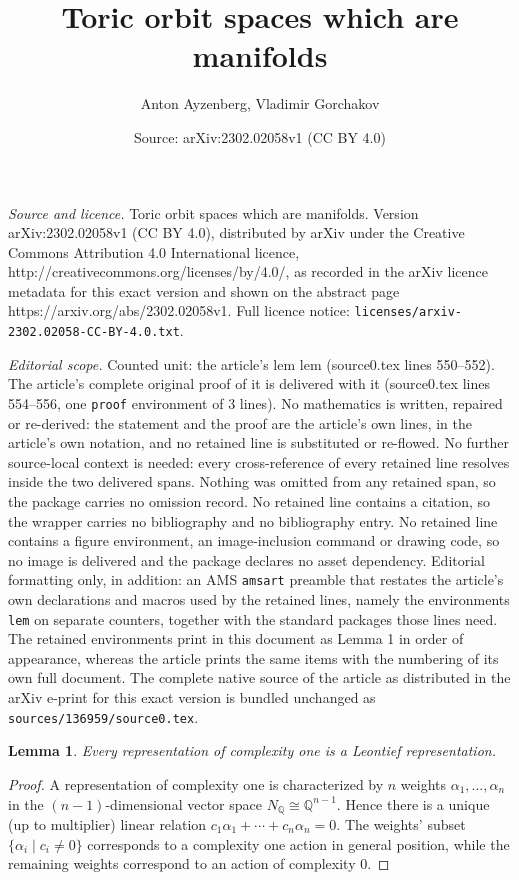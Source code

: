 \documentclass[10pt,a4paper]{amsart}
\title{Toric orbit spaces which are manifolds}
\author{Anton Ayzenberg, Vladimir Gorchakov}
\date{Source: arXiv:2302.02058v1 (CC BY 4.0)}
\newtheorem{lem}{Lemma}
\newcommand{\Nq}{N_\Qo}
\newcommand{\Qo}{\mathbb{Q}}
\begin{document}
\maketitle

\noindent\emph{Source and licence.} Toric orbit spaces which are manifolds. Version arXiv:2302.02058v1 (CC BY 4.0), distributed by arXiv under the Creative Commons Attribution 4.0 International licence, http://creativecommons.org/licenses/by/4.0/, as recorded in the arXiv licence metadata for this exact version and shown on the abstract page https://arxiv.org/abs/2302.02058v1. Full licence notice: \texttt{licenses/arxiv-2302.02058-CC-BY-4.0.txt}.\par\smallskip

\noindent\textit{Editorial scope.} Counted unit: the article's lem lem (source0.tex lines 550--552). The article's complete original proof of it is delivered with it (source0.tex lines 554--556, one \texttt{proof} environment of 3 lines). No mathematics is written, repaired or re-derived: the statement and the proof are the article's own lines, in the article's own notation, and no retained line is substituted or re-flowed.  No further source-local context is needed: every cross-reference of every retained line resolves inside the two delivered spans.  Nothing was omitted from any retained span, so the package carries no omission record.  No retained line contains a citation, so the wrapper carries no bibliography and no bibliography entry.  No retained line contains a figure environment, an image-inclusion command or drawing code, so no image is delivered and the package declares no asset dependency.  Editorial formatting only, in addition: an AMS \texttt{amsart} preamble that restates the article's own declarations and macros used by the retained lines, namely the environments \texttt{lem} on separate counters, together with the standard packages those lines need.  The retained environments print in this document as Lemma 1 in order of appearance, whereas the article prints the same items with the numbering of its own full document.  The complete native source of the article as distributed in the arXiv e-print for this exact version is bundled unchanged as \texttt{sources/136959/source0.tex}.
\begin{lem}
Every representation of complexity one is a Leontief representation.
\end{lem}

\begin{proof}
A representation of complexity one is characterized by $n$ weights $\alpha_1,\ldots,\alpha_n$ in the $(n-1)$-dimensional vector space $\Nq\cong\Qo^{n-1}$. Hence there is a unique (up to multiplier) linear relation $c_1\alpha_1+\cdots+c_n\alpha_n=0$. The weights' subset $\{\alpha_i\mid c_i\neq0\}$ corresponds to a complexity one action in general position, while the remaining weights correspond to an action of complexity $0$.
\end{proof}
\end{document}
